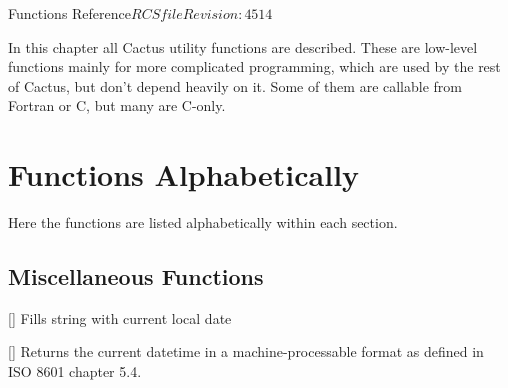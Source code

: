 
\begin{cactuspart}{ Functions Reference}{$RCSfile$}{$Revision: 4514 $}
\label{part:UtilReference}
\renewcommand{\thepage}{\Alph{part}\arabic{page}}


In this chapter all  Cactus utility functions are
described.  These are low-level functions mainly for more complicated
programming, which are used by the rest of Cactus, but don't depend
heavily on it.  Some of them are callable from Fortran or C, but
many are C-only.


\chapter{Functions Alphabetically}

Here the functions are listed alphabetically within each section.


\section{Miscellaneous Functions}

\begin{Lentry}

\item[\code{Util\_CurrentDate}] [\pageref{Util-CurrentDate}]
  Fills string with current local date

\item[\code{Util\_CurrentDateTime}] [\pageref{Util-CurrentDateTime}]
  Returns the current datetime in a machine-processable format
  as defined in ISO 8601 chapter 5.4.


\end{Lentry}
\end{cactuspart}
